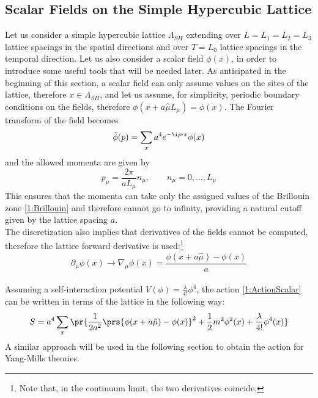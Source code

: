 \subsection{Scalar Fields on the Simple Hypercubic Lattice}
Let us consider a simple hypercubic lattice $\Lambda_{SH}$ extending over $L=L_1=L_2=L_3$ lattice spacings in the spatial directions and over $T=L_0$ lattice spacings in the temporal direction.
Let us also consider a scalar field $\phi(x)$, in order to introduce some useful tools that will be needed later.
As anticipated in the beginning of this section, a scalar field can only assume values on the sites of the lattice, therefore $x\in\Lambda_{SH}$, and let us assume, for simplicity, periodic boundary conditions on the fields, therefore $\phi(x+a\hat\mu L_\mu)=\phi(x)$.
The Fourier transform of the field becomes
\begin{equation}
    \tilde\phi(p)=\sum_x a^4 e^{-\i p\cdot x}\phi(x) \label{1:FourierScalar}
\end{equation}
and the allowed momenta are given by
\begin{equation}
    p_\mu=\frac{2\pi}{aL_\mu}n_\mu, \qquad n_\mu=0, \dots, L_\mu \label{1:Brillouin}
\end{equation}
This ensures that the momenta can take only the assigned values of the Brillouin zone \eqref{1:Brillouin} and therefore cannot go to infinity, providing a natural cutoff given by the lattice spacing $a$.\\
The discretization also implies that derivatives of the fields cannot be computed, therefore the lattice forward derivative is used:\footnote{Note that, in the continuum limit, the two derivatives coincide.}
\begin{equation}
    \partial_\mu\phi(x)\rightarrow \nabla_\mu\phi(x)=\frac{\phi(x+a\hat\mu)-\phi(x)}{a} \label{1:ForwardLatticeDerivative}
\end{equation}\\
Assuming a self-interaction potential $V(\phi)=\frac\lambda{4!}\phi^4$, the action \eqref{1:ActionScalar} can be written in terms of the lattice in the following way:
\begin{equation}
    S=a^4\sum_x\pr{\frac1{2a^2}\prs{\phi(x+a\hat\mu)-\phi(x)}^2+\frac12m^2\phi^2(x)+\frac\lambda{4!}\phi^4(x)} \label{1:ScalarActionLattice}
\end{equation}
A similar approach will be used in the following section to obtain the action for Yang-Mills theories.

